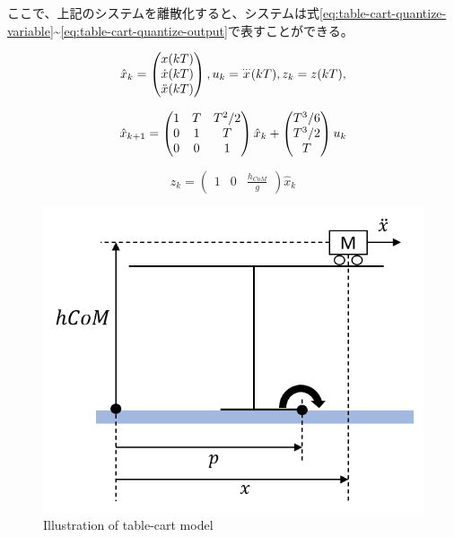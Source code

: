 \newpage

ここで、上記のシステムを離散化すると、システムは式\eqref{eq:table-cart-quantize-variable}\textasciitilde\eqref{eq:table-cart-quantize-output}で表すことができる。


\begin{equation}
  \hat{x}_{k}=
  \begin{pmatrix}
    x(kT)\cr \dot{x}(kT)\cr\ddot{x}(kT)
  \end{pmatrix}
  ,
  u_{k}
    =
    {\buildrel\ldots\over{x}}(kT)
  , z_{k}=z(kT),
  \label{eq:table-cart-quantize-variable}
\end{equation}

\begin{equation}
  \hat{x}_{k+1}=
  \begin{pmatrix}
    1 & T & T^{2}/2\cr 0 & 1 & T\cr 0 & 0 & 1
  \end{pmatrix}
  \hat{x}_{k} +
  \begin{pmatrix}
    T^{3}/6 \\  T^{3}/2 \\ T
  \end{pmatrix}
  u_{k}
  \label{eq:table-cart-quantize-state}
\end{equation}

\begin{equation}
  z_{k} =
  \begin{pmatrix}
    1 & 0 & \frac{h_{CoM}}{g}
  \end{pmatrix}
  \hat{x}_{k}
  \label{eq:table-cart-quantize-output}
\end{equation}

\begin{figure}[hbtp]
  \centering
  \includegraphics[keepaspectratio, scale=0.6]
  {images/table_cart_hcom.png}
  \caption{Illustration of table-cart model }
  \label{Fig:tablecart}
\end{figure}



